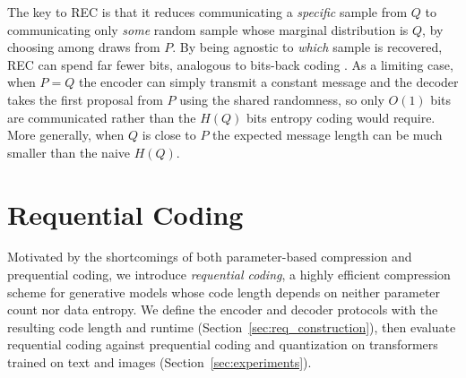 \documentclass{article}
\theoremstyle{plain}
\theoremstyle{definition}
\theoremstyle{remark}
\begin{document}
The key to REC is that it reduces communicating a \emph{specific} sample from $Q$ to communicating only \emph{some} random sample whose marginal distribution is $Q$, by choosing among draws from $P.$ By being agnostic to \emph{which} sample is recovered, REC can spend far fewer bits, analogous to bits-back coding \citep{hinton1993autoencoders}. As a limiting case, when $P=Q$ the encoder can simply transmit a constant message and the decoder takes the first proposal from $P$ using the shared randomness, so only $O(1)$ bits are communicated rather than the $H(Q)$ bits entropy coding would require. More generally, when $Q$ is close to $P$ the expected message length can be much smaller than the naive $H(Q)$. 


\section{Requential Coding}
Motivated by the shortcomings of both parameter-based compression and prequential coding, we introduce \emph{requential coding}, a highly efficient compression scheme for generative models whose code length depends on neither parameter count nor data entropy. We define the encoder and decoder protocols with the resulting code length and runtime (Section~\ref{sec:req_construction}), then evaluate requential coding against prequential coding and quantization on transformers trained on text and images (Section~\ref{sec:experiments}).


\renewcommand{\algorithmicrequire}{\textbf{Input:}}
\renewcommand{\algorithmicensure}{\textbf{Output:}}
\end{document}
